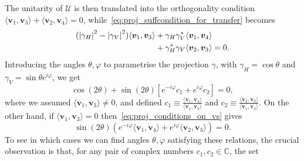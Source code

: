 \documentclass[
	aps, pra, authorblock, superscriptaddress, twocolumn,
	10pt
]{revtex4-1}
\newcommand{\bs}[1]{\boldsymbol{#1}}
\newcommand{\U}{\mathcal{U}}
\newcommand{\CC}{\mathbb{C}}
\begin{document}
The unitarity of $\U$ is then translated into the orthogonality condition $\langle\bs v_1,\bs v_3\rangle+\langle\bs v_2,\bs v_4\rangle=0$, while~\cref{eq:proj_suffcondition_for_transfer} becomes
\begin{equation}
\begin{aligned}
    (\abs{\gamma_H}^2-\abs{\gamma_V}^2) \langle\bs v_1,\bs v_3\rangle &+
    \gamma_H\gamma_V^* \langle\bs v_1, \bs v_4\rangle \\
    &+ \gamma_H^*\gamma_V \langle\bs v_2, \bs v_3\rangle = 0.
\end{aligned}
\label{eq:proj_conditions_on_vs}
\end{equation}
Introducing the angles $\theta,\varphi$ to parametrise the projection $\gamma$, with $\gamma_H=\cos\theta$ and $\gamma_V=\sin\theta e^{i\varphi}$, we get
\begin{equation}
    \cos(2\theta) +
    \sin(2\theta) \left[
        e^{-i\varphi}c_1 +
        e^{i\varphi}c_2
    \right] = 0,
    \label{eq:proj_anglecondition_1}
\end{equation}
where we assumed $\langle\bs v_1,\bs v_3\rangle\neq0$, and defined
$c_1\equiv \frac{\langle\bs v_1,\bs v_4\rangle}{\langle\bs v_1,\bs v_3\rangle}$ and
$c_2\equiv \frac{\langle\bs v_2,\bs v_3\rangle}{ \langle\bs v_1,\bs v_3\rangle }$.
On the other hand, if $\langle\bs v_1,\bs v_3\rangle=0$ then~\cref{eq:proj_conditions_on_vs} gives
\begin{equation}
    \sin(2\theta)(
    e^{-i\varphi} \langle\bs v_1,\bs v_4\rangle +
    e^{i\varphi}\langle\bs v_2,\bs v_3\rangle
    ) = 0.
    \label{eq:proj_anglecondition_2}
\end{equation}
To see in which cases we can find angles $\theta,\varphi$ satisfying these relations, the crucial observation is that, for any pair of complex numbers $c_1,c_2\in\CC$, the set
\end{document}

